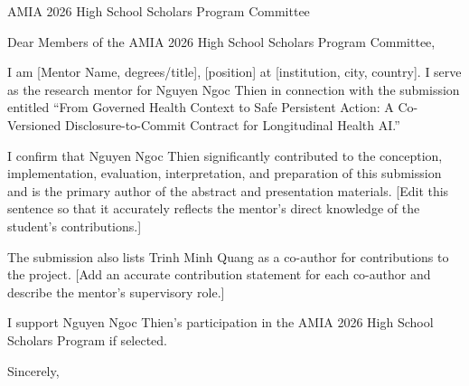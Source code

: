 \documentclass[11pt,letterpaper]{letter}
\begin{document}
\begin{letter}{AMIA 2026 High School Scholars Program Committee}
\opening{Dear Members of the AMIA 2026 High School Scholars Program Committee,}

I am [Mentor Name, degrees/title], [position] at [institution, city, country]. I serve as the research mentor for Nguyen Ngoc Thien in connection with the submission entitled ``From Governed Health Context to Safe Persistent Action: A Co-Versioned Disclosure-to-Commit Contract for Longitudinal Health AI.''

I confirm that Nguyen Ngoc Thien significantly contributed to the conception, implementation, evaluation, interpretation, and preparation of this submission and is the primary author of the abstract and presentation materials. [Edit this sentence so that it accurately reflects the mentor's direct knowledge of the student's contributions.]

The submission also lists Trinh Minh Quang as a co-author for contributions to the project. [Add an accurate contribution statement for each co-author and describe the mentor's supervisory role.]

I support Nguyen Ngoc Thien's participation in the AMIA 2026 High School Scholars Program if selected.

\closing{Sincerely,}
\end{letter}
\end{document}
